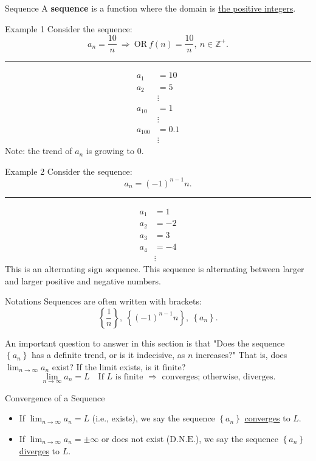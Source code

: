 \documentclass[12pt,a4paper]{article}
\def\Z{{\mathbb{Z}}}
\def\DNE{\mathrm{D.N.E.}}
\begin{document}
\begin{df}{Sequence}
	A \textbf{sequence} is a function where the domain is \underline{the positive integers}.	
\end{df}
\begin{eg}{Example 1}
	Consider the sequence: $$a_n=\frac{10}{n}\ \Rightarrow\ \text{OR}\ f(n)=\frac{10}{n},\ n\in\Z^+.$$	
	\noindent\rule[0.25\baselineskip]{\textwidth}{1pt}
	$$\begin{aligned}
		a_1&=10\\
		a_2&=5\\
		&\vdots\\
		a_{10}&=1\\
		&\vdots\\
		a_{100}&=0.1\\
		&\vdots
	\end{aligned}$$
	Note: the trend of $a_n$ is growing to $0$.
\end{eg}
\begin{eg}{Example 2}
	Consider the sequence: $$a_n=(-1)^{n-1}n.$$	
	\noindent\rule[0.25\baselineskip]{\textwidth}{1pt}
	$$\begin{aligned}
		a_1&=1\\
		a_2&=-2\\
		a_3&=3\\
		a_{4}&=-4\\
		&\vdots
	\end{aligned}$$
	This is an alternating sign sequence. This sequence is alternating between larger and larger positive and negative numbers. 
\end{eg}
\begin{rmk}{Notations}
	Sequences are often written with brackets: 
	$$\left\{\frac{1}{n}\right\},\ \left\{(-1)^{n-1}n\right\},\ \left\{a_n\right\}.$$
\end{rmk}
An important question to answer in this section is that "Does the sequence $\left\{a_n\right\}$ has a definite trend, or is it indecisive, as $n$ increases?" That is, does $\displaystyle\lim_{n\to\infty}a_n$ exist? If the limit exists, is it finite? 
$$\lim_{n\to\infty}a_n=L\quad\text{If }L\text{ is finite }\Rightarrow\text{ converges; otherwise, diverges.}$$
\begin{df}{Convergence of a Sequence}
	\begin{itemize}
	\item If $\displaystyle\lim_{n\to\infty}a_n=L$ (i.e., exists), we say the sequence $\left\{a_n\right\}$	\underline{converges} to $L$. 
	\item If $\displaystyle\lim_{n\to\infty}a_n=\pm\infty$ or does not exist ($\DNE$), we say the sequence $\left\{a_n\right\}$	\underline{diverges} to $L$. 
	\end{itemize}
\end{df}
\end{document}
